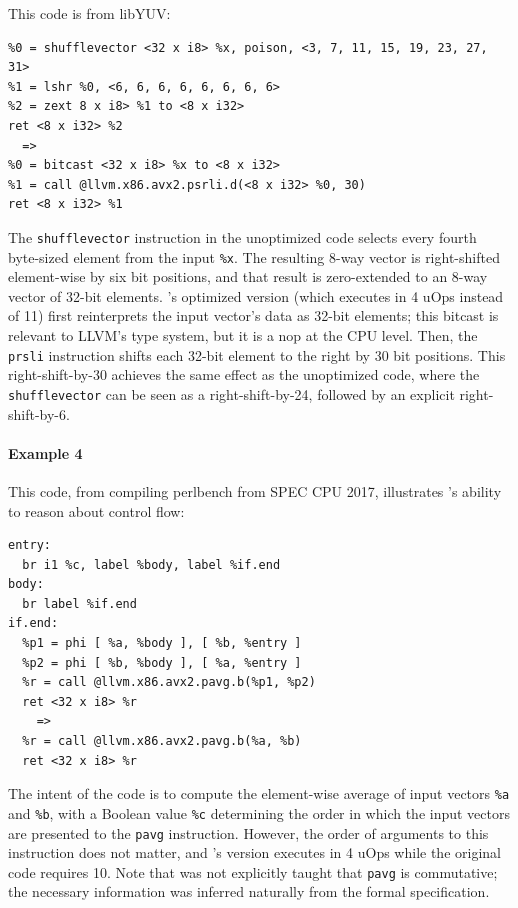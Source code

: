 This code is from libYUV:

{\begin{quoting}\begin{Verbatim}
%0 = shufflevector <32 x i8> %x, poison, <3, 7, 11, 15, 19, 23, 27, 31>
%1 = lshr %0, <6, 6, 6, 6, 6, 6, 6, 6>
%2 = zext 8 x i8> %1 to <8 x i32>
ret <8 x i32> %2
  =>
%0 = bitcast <32 x i8> %x to <8 x i32>
%1 = call @llvm.x86.avx2.psrli.d(<8 x i32> %0, 30)
ret <8 x i32> %1
\end{Verbatim}
\end{quoting}}

The \texttt{shufflevector} instruction in the unoptimized code selects
every fourth byte-sized element from the input \texttt{\%x}.
%
The resulting 8-way vector is right-shifted element-wise by six bit
positions, and that result is zero-extended to an 8-way vector of
32-bit elements.
%
\minotaur's optimized version (which executes in 4 uOps instead of 11)
first reinterprets the input vector's data as 32-bit elements; this
bitcast is relevant to LLVM's type system, but it is a nop at the CPU
level.
%
Then, the \texttt{prsli} instruction shifts each 32-bit element to the
right by 30 bit positions.
%
This right-shift-by-30 achieves the same effect as the unoptimized
code, where the \texttt{shufflevector} can be seen as a
right-shift-by-24, followed by an explicit right-shift-by-6.

\paragraph*{Example 4}

This code, from compiling perlbench from SPEC CPU 2017, illustrates
\minotaur's ability to reason about control flow:

{\begin{quoting}\begin{Verbatim}
entry:
  br i1 %c, label %body, label %if.end
body:
  br label %if.end
if.end:
  %p1 = phi [ %a, %body ], [ %b, %entry ]
  %p2 = phi [ %b, %body ], [ %a, %entry ]
  %r = call @llvm.x86.avx2.pavg.b(%p1, %p2)
  ret <32 x i8> %r
    =>
  %r = call @llvm.x86.avx2.pavg.b(%a, %b)
  ret <32 x i8> %r
\end{Verbatim}
\end{quoting}}

The intent of the code is to compute the element-wise average of input
vectors \texttt{\%a} and \texttt{\%b}, with a Boolean value
\texttt{\%c} determining the order in which the input vectors are
presented to the \texttt{pavg} instruction.
%
However, the order of arguments to this instruction does not matter, and
\minotaur's version executes in 4 uOps while the original code requires
10.
%
Note that \minotaur{} was not explicitly taught that \texttt{pavg} is
commutative; the necessary information was inferred naturally from the
formal specification.


